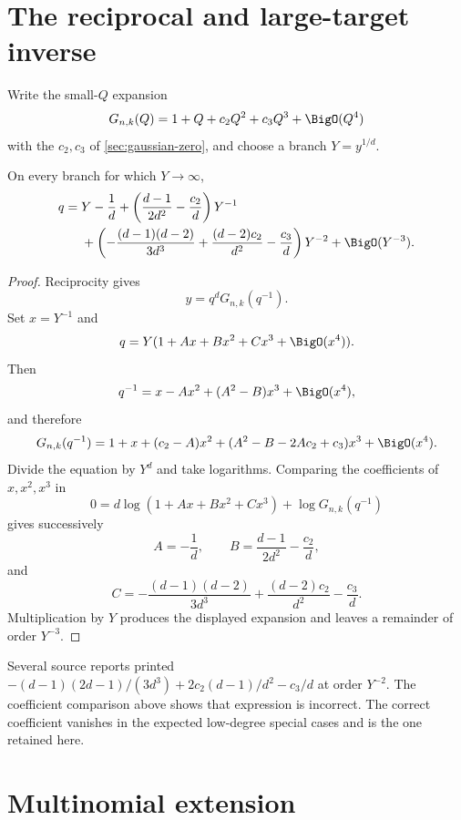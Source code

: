 \section{The reciprocal and large-target inverse}
\label{sec:gaussian-infinity}
\label{sec:gaussian-reciprocity}

Write the small-\(Q\) expansion
\[
  G_{n,k}(Q)=1+Q+c_2Q^2+c_3Q^3+\BigO(Q^4)
\]
with the \(c_2,c_3\) of \cref{sec:gaussian-zero}, and choose a branch
\(Y=y^{1/d}\).

\begin{theorem}
\label{thm:gq-large-inverse}
On every branch for which \(Y\to\infty\),
\begin{align*}
  q={}&Y-\frac1d
  +\left(\frac{d-1}{2d^2}-\frac{c_2}{d}\right)Y^{-1}\\
  &+\left(
    -\frac{(d-1)(d-2)}{3d^3}
    +\frac{(d-2)c_2}{d^2}
    -\frac{c_3}{d}
  \right)Y^{-2}
  +\BigO(Y^{-3}).
\end{align*}
\end{theorem}

\begin{proof}
Reciprocity gives
\[
  y=q^dG_{n,k}(q^{-1}).
\]
Set \(x=Y^{-1}\) and
\[
  q=Y(1+Ax+Bx^2+Cx^3+\BigO(x^4)).
\]
Then
\[
  q^{-1}
  =x-Ax^2+(A^2-B)x^3+\BigO(x^4),
\]
and therefore
\[
  G_{n,k}(q^{-1})
  =1+x+(c_2-A)x^2+
   (A^2-B-2Ac_2+c_3)x^3+\BigO(x^4).
\]
Divide the equation by \(Y^d\) and take logarithms.  Comparing the
coefficients of \(x,x^2,x^3\) in
\[
  0=d\log(1+Ax+Bx^2+Cx^3)
    +\log G_{n,k}(q^{-1})
\]
gives successively
\[
  A=-\frac1d,\qquad
  B=\frac{d-1}{2d^2}-\frac{c_2}{d},
\]
and
\[
  C=-\frac{(d-1)(d-2)}{3d^3}
    +\frac{(d-2)c_2}{d^2}
    -\frac{c_3}{d}.
\]
Multiplication by \(Y\) produces the displayed expansion and leaves a
remainder of order \(Y^{-3}\).
\end{proof}

\begin{remark}
Several source reports printed
\(-{(d-1)(2d-1)}/{(3d^3)}
+{2c_2(d-1)}/{d^2}-{c_3}/{d}\) at order \(Y^{-2}\).
The coefficient comparison above shows that expression is incorrect.  The
correct coefficient vanishes in the expected low-degree special cases and is
the one retained here.
\end{remark}

\section{Multinomial extension}
\label{sec:qmultinomial}

